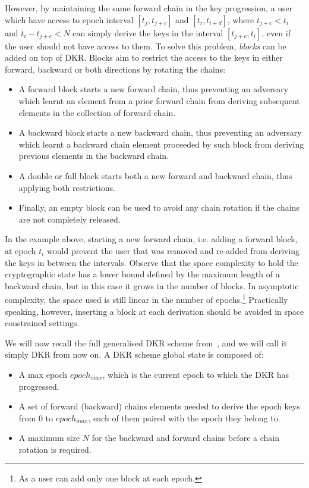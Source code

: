 However, by maintaining the same forward chain in the key progression,
a user which have access to epoch interval 
$[t_j, t_{j + c}]$ and $[t_i, t_{i + d}]$, 
where $t_{j + c} < t_i$ and $t_i - t_{j + c} < N$  
can simply derive the keys in the interval $[t_{j + c}, t_i]$, even if 
the user should not have access to them.
To solve this problem, \textit{blocks} can be added on top of DKR.
Blocks aim to restrict the access to the keys in either forward, backward
or both directions by rotating the chains:
\begin{itemize}
    \item A forward block starts a new forward chain, thus preventing an adversary which learnt an element from a prior forward chain from deriving subsequent elements in the collection of forward chain. 
    \item A backward block starts a new backward chain, thus preventing an adversary which learnt a backward chain element proceeded by such block from deriving previous elements in the backward chain.
    \item A double or full block starts both a new forward and backward chain, thus applying both restrictions.
    \item Finally, an empty block can be used to avoid any chain rotation if the chains are not completely released.
\end{itemize} 
In the example above, starting a new forward chain, i.e. adding a forward block,
at epoch $t_i$ would prevent the user that was removed and re-added from deriving the keys in between 
the intervals. Observe that the space complexity to hold the cryptographic
state has a lower bound defined by the maximum length of a backward chain,
but in this case it grows in the number of blocks. In asymptotic
complexity, the space used is still linear in the number of epochs.\footnote{As a user can add only one block at each epoch.}
Practically speaking, however, inserting a block at each derivation
should be avoided in space constrained settings. 



We will now recall the full generalised DKR scheme from~\cite{GKP}, and we will call it simply DKR from now on. 
A DKR scheme global state is composed of:
\begin{itemize}
    \item A max epoch $epoch_{max}$, which is the current epoch to which the DKR has progressed.
    \item A set of forward (backward) chains elements needed to derive the epoch keys from 0 to $epoch_{max}$, each of them paired with the epoch they belong to.
    \item A maximum size $N$ for the backward and forward chains before a chain rotation is required.
\end{itemize}

